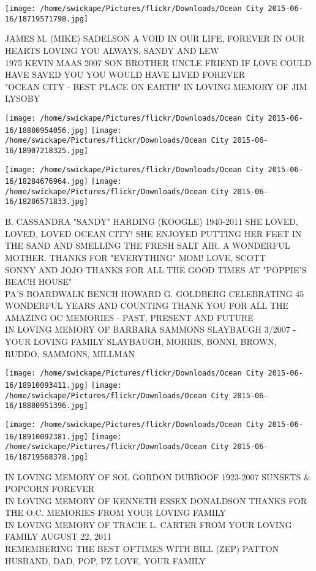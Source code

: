 \documentclass[10pt,letterpaper]{article}
\begin{document}
\vspace{0.25in}
\texttt{[image: /home/swickape/Pictures/flickr/Downloads/Ocean City 2015-06-16/18719571798.jpg]}

JAMES M. (MIKE) SADELSON A VOID IN OUR LIFE, FOREVER IN OUR HEARTS LOVING YOU ALWAYS, SANDY AND LEW\\
1975 KEVIN MAAS 2007 SON BROTHER UNCLE FRIEND IF LOVE COULD HAVE SAVED YOU YOU WOULD HAVE LIVED FOREVER\\
"OCEAN CITY {-} BEST PLACE ON EARTH" IN LOVING MEMORY OF JIM LYSOBY\\
\pagebreak

\texttt{[image: /home/swickape/Pictures/flickr/Downloads/Ocean City 2015-06-16/18880954056.jpg]}
\texttt{[image: /home/swickape/Pictures/flickr/Downloads/Ocean City 2015-06-16/18907218325.jpg]}

\texttt{[image: /home/swickape/Pictures/flickr/Downloads/Ocean City 2015-06-16/18284676964.jpg]}
\texttt{[image: /home/swickape/Pictures/flickr/Downloads/Ocean City 2015-06-16/18286571833.jpg]}

B. CASSANDRA "SANDY" HARDING (KOOGLE) 1940{-}2011 SHE LOVED, LOVED, LOVED OCEAN CITY!  SHE ENJOYED PUTTING HER FEET IN THE SAND AND SMELLING THE FRESH SALT AIR.  A WONDERFUL MOTHER.  THANKS FOR "EVERYTHING" MOM!  LOVE, SCOTT\\
SONNY AND JOJO THANKS FOR ALL THE GOOD TIMES AT "POPPIE'S BEACH HOUSE"\\
PA'S BOARDWALK BENCH HOWARD G. GOLDBERG CELEBRATING 45 WONDERFUL YEARS AND COUNTING THANK YOU FOR ALL THE AMAZING OC MEMORIES {-} PAST, PRESENT AND FUTURE\\
IN LOVING MEMORY OF BARBARA SAMMONS SLAYBAUGH 3/2007 {-} YOUR LOVING FAMILY SLAYBAUGH, MORRIS, BONNI, BROWN, RUDDO, SAMMONS, MILLMAN\\
\pagebreak

\texttt{[image: /home/swickape/Pictures/flickr/Downloads/Ocean City 2015-06-16/18910093411.jpg]}
\texttt{[image: /home/swickape/Pictures/flickr/Downloads/Ocean City 2015-06-16/18880951396.jpg]}

\texttt{[image: /home/swickape/Pictures/flickr/Downloads/Ocean City 2015-06-16/18910092381.jpg]}
\texttt{[image: /home/swickape/Pictures/flickr/Downloads/Ocean City 2015-06-16/18719568378.jpg]}

IN LOVING MEMORY OF SOL GORDON DUBROOF 1923{-}2007 SUNSETS \& POPCORN FOREVER\\
IN LOVING MEMORY OF KENNETH ESSEX DONALDSON THANKS FOR THE O.C. MEMORIES FROM YOUR LOVING FAMILY\\
IN LOVING MEMORY OF TRACIE L. CARTER FROM YOUR LOVING FAMILY AUGUST 22, 2011\\
REMEMBERING THE BEST OFTIMES WITH BILL (ZEP) PATTON HUSBAND, DAD, POP, PZ LOVE, YOUR FAMILY\\
\pagebreak
\end{document}
